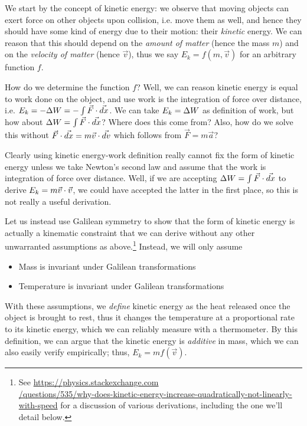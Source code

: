 We start by the concept of kinetic energy: we observe that moving objects can exert force on other objects upon collision, i.e. move them as well, and hence they should have some kind of energy due to their motion: their \emph{kinetic} energy. We can reason that this should depend on the \emph{amount of matter} (hence the mass $m$) and on the \emph{velocity of matter} (hence $\vec{v}$), thus we say $E_k=f(m,\vec v)$ for an arbitrary function $f$.

How do we determine the function $f$? Well, we can reason kinetic energy is equal to work done on the object, and use work is the integration of force over distance, i.e. $E_k=-\De W=-\int\vec{F}\.\vec{dx}$. We can take $E_k=\De W$ as definition of work, but how about $\De W=\int\vec{F}\.\vec{dx}$? Where does this come from? Also, how do we solve this without $\vec{F}\.\vec{dx}=m\vec{v}\.\vec{dv}$ which follows from $\vec{F}=m\vec{a}$? 

Clearly using kinetic energy-work definition really cannot fix the form of kinetic energy unless we take Newton's second law and assume that the work is integration of force over distance. Well, if we are accepting $\De W=\int \vec{F}\.\vec{dx}$ to derive $E_k=m\vec{v}\.\vec{v}$, we could have accepted the latter in the first place, so this is not really a useful derivation.

Let us instead use Galilean symmetry to show that the form of kinetic energy is actually a kinematic constraint that we can derive without any other unwarranted assumptions as above.\footnote{
	See \hyperref{https://physics.stackexchange.com/questions/535/why-does-kinetic-energy-increase-quadratically-not-linearly-with-speed}{}{}{https://physics.stackexchange.com\\/questions/535/why-does-kinetic-energy-increase-quadratically-not-linearly-with-speed} for a discussion of various derivations, including the one we'll detail below.
} Instead, we will only assume
\begin{itemize}
	\item Mass is invariant under Galilean transformations
	\item Temperature is  invariant under Galilean transformations
\end{itemize}
With these assumptions, we \emph{define} kinetic energy as the heat released once the object is brought to rest, thus it changes the temperature at a proportional rate to its kinetic energy, which we can reliably measure with a thermometer. By this definition, we can argue that the kinetic energy is \emph{additive} in mass, which we can also easily verify empirically; thus, $E_k=mf(\vec{v})$.

